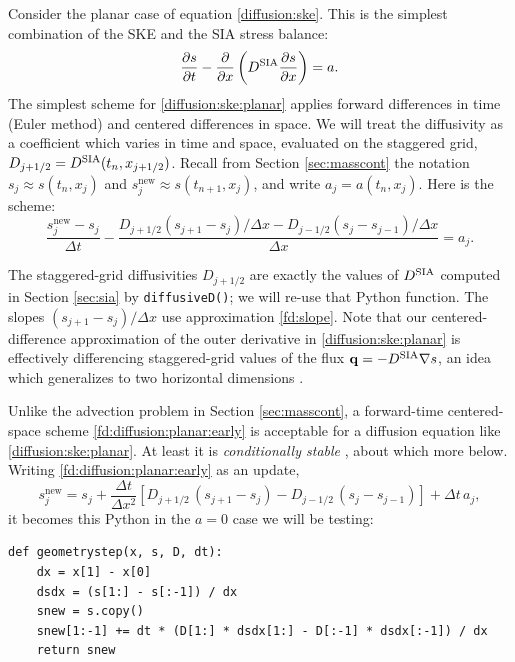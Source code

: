 \documentclass[letterpaper,final,12pt,reqno]{amsart}
\newcommand{\bq}{\mathbf{q}}
\newcommand{\grad}{\nabla}
\newcommand{\snew}{s^{\text{new}}}
\newcommand{\Dsia}{D^{\text{\textrm{SIA}}}}
\begin{document}
Consider the planar case of equation \eqref{diffusion:ske}.  This is the simplest combination of the SKE and the SIA stress balance:
\begin{equation}
\frac{\partial s}{\partial t} - \frac{\partial}{\partial x} \left(\Dsia \frac{\partial s}{\partial x}\right) = a.  \label{diffusion:ske:planar}
\end{equation}
The simplest scheme for \eqref{diffusion:ske:planar} applies forward differences in time (Euler method) and centered differences in space.  We will treat the diffusivity as a coefficient which varies in time and space, evaluated on the staggered grid, $D_{j+1/2} = \Dsia(t_n,x_{j+1/2})$.  Recall from Section \ref{sec:masscont} the notation $s_j \approx s(t_n,x_j)$ and $\snew_j\approx s(t_{n+1},x_j)$, and write $a_j= a(t_n,x_j)$.  Here is the scheme:
\begin{equation}
\frac{\snew_j - s_j}{\Delta t} - \frac{D_{j+1/2} (s_{j+1} - s_j)/\Delta x - D_{j-1/2} (s_j - s_{j-1})/\Delta x}{\Delta x} = a_j.  \label{fd:diffusion:planar:early}
\end{equation}

The staggered-grid diffusivities $D_{j+1/2}$ are exactly the values of $\Dsia$ computed in Section \ref{sec:sia} by \texttt{diffusiveD()}; we will re-use that Python function.  The slopes $(s_{j+1} - s_j)/\Delta x$ use approximation \eqref{fd:slope}.  Note that our centered-difference approximation of the outer derivative in \eqref{diffusion:ske:planar} is effectively differencing staggered-grid values of the flux $\bq=-\Dsia \grad s$, an idea which generalizes to two horizontal dimensions \cite{Bueler2016}.

Unlike the advection problem in Section \ref{sec:masscont}, a forward-time centered-space scheme \eqref{fd:diffusion:planar:early} is acceptable for a diffusion equation like \eqref{diffusion:ske:planar}.  At least it is \emph{conditionally stable} \cite{MortonMayers2005}, about which more below.  Writing \eqref{fd:diffusion:planar:early} as an update,
\begin{equation}
\snew_j = s_j + \frac{\Delta t}{\Delta x^2} \left[D_{j+1/2}\, (s_{j+1} - s_j) - D_{j-1/2}\, (s_j - s_{j-1})\right] + \Delta t\,a_j,  \label{fd:diffusion:planar}
\end{equation}
it becomes this Python in the $a=0$ case we will be testing:
\begin{lstlisting}[language=PythonPlus, xleftmargin=4mm]
def geometrystep(x, s, D, dt):
    dx = x[1] - x[0]
    dsdx = (s[1:] - s[:-1]) / dx
    snew = s.copy()
    snew[1:-1] += dt * (D[1:] * dsdx[1:] - D[:-1] * dsdx[:-1]) / dx
    return snew
\end{lstlisting}
\end{document}
